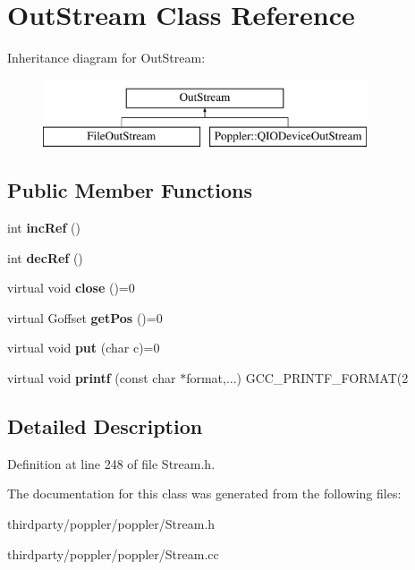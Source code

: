 \hypertarget{class_out_stream}{}\section{Out\+Stream Class Reference}
\label{class_out_stream}
Inheritance diagram for Out\+Stream\+:\begin{figure}[H]
\begin{center}
\leavevmode
\includegraphics[height=2.000000cm]{class_out_stream}
\end{center}
\end{figure}
\subsection*{Public Member Functions}
\begin{DoxyCompactItemize}
\item 
\mbox{\label{class_out_stream_aed1449b289dbe1b1111a1c94c9c0e1dc}} 
int {\bfseries inc\+Ref} ()
\item 
\mbox{\label{class_out_stream_a8d8da9e7fdf9d7d14777ffb3197e32a6}} 
int {\bfseries dec\+Ref} ()
\item 
\mbox{\label{class_out_stream_ae35f51b6da6b70c80b70903c80c25ab8}} 
virtual void {\bfseries close} ()=0
\item 
\mbox{\label{class_out_stream_adda8af0e39a0be6e16a02627d2e3e72c}} 
virtual Goffset {\bfseries get\+Pos} ()=0
\item 
\mbox{\label{class_out_stream_a8a7f1600fea4c1d8075ade5bb1dcebb3}} 
virtual void {\bfseries put} (char c)=0
\item 
\mbox{\label{class_out_stream_a87755291f0a2ae197e7efc0010089d9c}} 
virtual void {\bfseries printf} (const char $\ast$format,...) G\+C\+C\+\_\+\+P\+R\+I\+N\+T\+F\+\_\+\+F\+O\+R\+M\+AT(2
\end{DoxyCompactItemize}


\subsection{Detailed Description}


Definition at line 248 of file Stream.\+h.



The documentation for this class was generated from the following files\+:\begin{DoxyCompactItemize}
\item 
thirdparty/poppler/poppler/Stream.\+h\item 
thirdparty/poppler/poppler/Stream.\+cc\end{DoxyCompactItemize}
